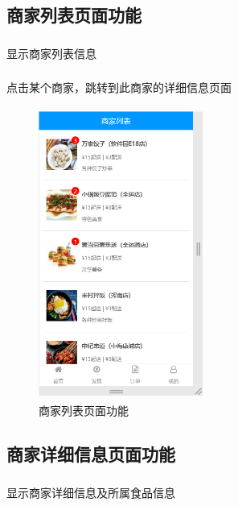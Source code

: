 \subsection{商家列表页面功能}
\subsubsection*{}
显示商家列表信息
\subsubsection*{}
点击某个商家，跳转到此商家的详细信息页面
\begin{figure}[H]
    \centering
    \includegraphics[width=5.4cm,height=9.6cm]{figures/2.2.2.png}
    \caption{商家列表页面功能}
\end{figure}

\subsection{商家详细信息页面功能}
\subsubsection*{}
显示商家详细信息及所属食品信息
